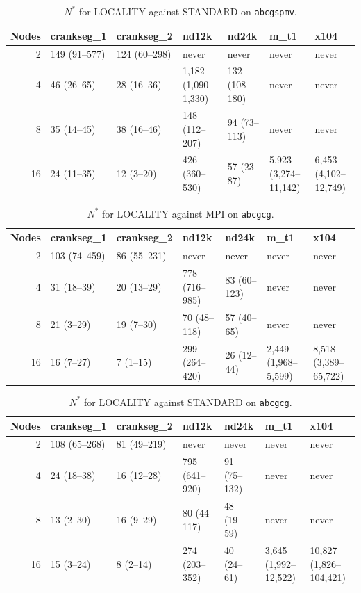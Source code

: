 \documentclass[11pt]{article}
\newcommand{\spmv}{\texttt{abcgspmv}}
\newcommand{\cg}{\texttt{abcgcg}}
\begin{document}
\begin{table}[H]
\centering
\footnotesize
\setlength{\tabcolsep}{3.5pt}
\caption{$N^*$ for LOCALITY against STANDARD on \spmv.}
\label{tab:app:h8abcgspmvSTANDARD}
\begin{tabular}{@{}rllllll@{}}
\toprule
Nodes & crankseg\_1 & crankseg\_2 & nd12k & nd24k & m\_t1 & x104 \\
\midrule
2 & 149 (91--577) & 124 (60--298) & never & never & never & never \\
4 & 46 (26--65) & 28 (16--36) & 1,182 (1,090--1,330) & 132 (108--180) & never & never \\
8 & 35 (14--45) & 38 (16--46) & 148 (112--207) & 94 (73--113) & never & never \\
16 & 24 (11--35) & 12 (3--20) & 426 (360--530) & 57 (23--87) & 5,923 (3,274--11,142) & 6,453 (4,102--12,749) \\
\bottomrule
\end{tabular}
\end{table}



\begin{table}[H]
\centering
\footnotesize
\setlength{\tabcolsep}{3.5pt}
\caption{$N^*$ for LOCALITY against MPI on \cg.}
\label{tab:app:h8abcgcgMPI}
\begin{tabular}{@{}rllllll@{}}
\toprule
Nodes & crankseg\_1 & crankseg\_2 & nd12k & nd24k & m\_t1 & x104 \\
\midrule
2 & 103 (74--459) & 86 (55--231) & never & never & never & never \\
4 & 31 (18--39) & 20 (13--29) & 778 (716--985) & 83 (60--123) & never & never \\
8 & 21 (3--29) & 19 (7--30) & 70 (48--118) & 57 (40--65) & never & never \\
16 & 16 (7--27) & 7 (1--15) & 299 (264--420) & 26 (12--44) & 2,449 (1,968--5,599) & 8,518 (3,389--65,722) \\
\bottomrule
\end{tabular}
\end{table}



\begin{table}[H]
\centering
\footnotesize
\setlength{\tabcolsep}{3.5pt}
\caption{$N^*$ for LOCALITY against STANDARD on \cg.}
\label{tab:app:h8abcgcgSTANDARD}
\begin{tabular}{@{}rllllll@{}}
\toprule
Nodes & crankseg\_1 & crankseg\_2 & nd12k & nd24k & m\_t1 & x104 \\
\midrule
2 & 108 (65--268) & 81 (49--219) & never & never & never & never \\
4 & 24 (18--38) & 16 (12--28) & 795 (641--920) & 91 (75--132) & never & never \\
8 & 13 (2--30) & 16 (9--29) & 80 (44--117) & 48 (19--59) & never & never \\
16 & 15 (3--24) & 8 (2--14) & 274 (203--352) & 40 (24--61) & 3,645 (1,992--12,522) & 10,827 (1,826--104,421) \\
\bottomrule
\end{tabular}
\end{table}
\end{document}

